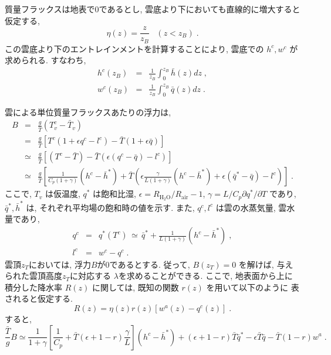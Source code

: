 質量フラックスは地表で0であるとし,
雲底より下においても直線的に増大すると仮定する,
\begin{equation}
 \eta (z) =   \frac{z}{z_B} \; \; \; ( z<z_B ) \; .
\end{equation}
この雲底より下のエントレインメントを計算することにより,
雲底での $h^c,w^c$ が求められる. すなわち,
\begin{eqnarray}
  h^c(z_B) & = & \frac{1}{z_B} \int_0^{z_B} \bar{h}(z) dz \; , \\
  w^c(z_B) & = & \frac{1}{z_B} \int_0^{z_B} \bar{q}(z) dz \; .
\end{eqnarray}

雲による単位質量フラックスあたりの浮力は,
\begin{eqnarray}
   B & = &  \frac{g}{\bar{T}} ( T_v^c - \bar{T}_v ) \nonumber\\
     & = &  \frac{g}{\bar{T}} 
            \left[ T^c ( 1+\epsilon q^c-l^c ) 
                      - \bar{T} ( 1+\epsilon \bar{q} ) \right] \nonumber\\
     & \simeq & \frac{g}{\bar{T}} 
               \left[ ( T^c - \bar{T} ) 
               - \bar{T} \left( \epsilon(q^c-\bar{q}) -l^c \right) 
                                                     \right] \nonumber\\
     & \simeq & \frac{g}{\bar{T}} 
                \left[ \frac{1}{C_p(1+\gamma)} (h^c-\bar{h}^*)
                       + \bar{T} \left( \epsilon \frac{\gamma}{L(1+\gamma)} 
                                                     (h^c-\bar{h}^*)
                               + \epsilon (\bar{q}^* - \bar{q} ) 
                               - l^c                      \right) \right] \; .
\end{eqnarray}
ここで, $T_v$ は仮温度, $q^*$ は飽和比湿,
$\epsilon = R_{\mbox{H}_2\mbox{O}}/R_{\mbox{air}} -1$,
$\gamma = L/C_p \partial q^*/\partial T$ であり,
$\bar{q}^*, \bar{h}^*$ は, それぞれ平均場の飽和時の値を示す.
また, $q^c, l^c$ は雲の水蒸気量, 雲水量であり,
\begin{eqnarray}
  q^c & = & q^*(T^c) \, \simeq \,
           \bar{q}^* + \frac{1}{L(1+\gamma)} ( h^c - \bar{h}^* ) \; , \\  
  l^c & = & w^c - q^c \; .
\end{eqnarray}
雲頂$z_T$においては, 浮力$B$が0であるとする.
従って, $B(z_T)=0$ を解けば, 与えられた雲頂高度$z_T$に対応する
$\lambda$を求めることができる.
ここで, 地表面から上に積分した降水率 $R(z)$ に関しては, 
既知の関数 $r(z)$ を用いて以下のように
表されると仮定する. 
\begin{equation}
  R(z)   = \eta(z) r(z) \left[ w^a(z) - q^c(z) \right] \; .
\end{equation}
すると, 
\begin{equation}
\frac{\bar{T}}{g} B \simeq 
 \frac{1}{1+\gamma} 
 \left[ \frac{1}{C_p} + \bar{T} (\epsilon+1-r) \frac{\gamma}{L} \right]
  (h^c-\bar{h}^*)
  + (\epsilon+1-r) \bar{T} \bar{q}^* 
  - \epsilon  \bar{T} \bar{q}
  - \bar{T} (1-r) w^a \; .
\end{equation}

